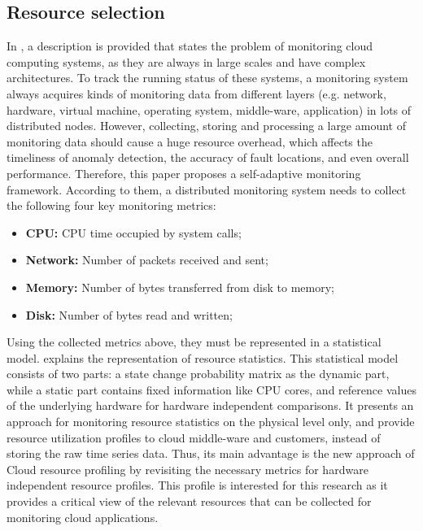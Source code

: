 \subsection{Resource selection} \label{sec:resource_selection}
In \cite{wang2018self}, a description is provided that states the problem of monitoring cloud computing systems, as they are always in large scales and have complex architectures. To track the running status of these systems, a monitoring system always acquires kinds of monitoring data from different layers (e.g. network, hardware, virtual machine, operating system, middle-ware, application) in lots of distributed nodes. However, collecting, storing and processing a large amount of monitoring data should cause a huge resource overhead, which affects the timeliness of anomaly detection, the accuracy of fault locations, and even overall performance. Therefore, this paper proposes a self-adaptive monitoring framework. According to them, a distributed monitoring system needs to collect the following four key monitoring metrics:
\begin{itemize}
    \item \textbf{CPU: }CPU time occupied by system calls;
    \item \textbf{Network: }Number of packets received and sent;
    \item \textbf{Memory: }Number of bytes transferred from disk to memory;
    \item \textbf{Disk: }Number of bytes read and written;
\end{itemize}

\noindent
Using the collected metrics above, they must be represented in a statistical model. \cite{hauser2018reviewing} explains the representation of resource statistics. This statistical model consists of two parts: a state change probability matrix as the dynamic part, while a static part contains fixed information like CPU cores, and reference values of the underlying hardware for hardware independent comparisons. It presents an approach for monitoring resource statistics on the physical level only, and provide resource utilization profiles to cloud middle-ware and customers, instead of storing the raw time series data. Thus, its main advantage is the new approach of Cloud resource profiling by revisiting the necessary metrics for hardware independent resource profiles. This profile is interested for this research as it provides a critical view of the relevant resources that can be collected for monitoring cloud applications.\\


